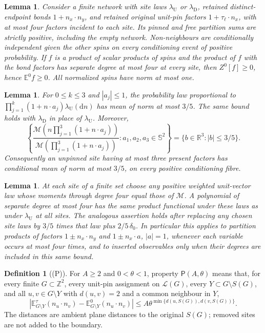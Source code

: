\documentclass[11pt,reqno]{amsart}
\newtheorem{lemma}[theorem]{Lemma}
\theoremstyle{definition}
\newtheorem{definition}[theorem]{Definition}
\theoremstyle{remark}
\begin{document}
\begin{lemma}\label{l:finitefacts}
Consider a finite network with site laws \(\lambda_{\mathrm U}\) or
\(\lambda_{\mathrm D}\), retained distinct-endpoint bonds
\(1+n_x\cdot n_y\), and retained original unit-pin factors
\(1+\tau_\ell\cdot n_x\), with at most four factors incident to each site.
Its pinned and free partition sums are strictly positive, including
the empty network. Non-neighbours are conditionally independent given
the other spins on every conditioning event of positive probability.
If \(f\) is a product of scalar products of spins and the product of
\(f\) with the bond factors has separate degree at most four at every
site, then \(Z^0[f]\ge0\), hence \(\mathbb E^0 f\ge0\).
All normalized spins have norm at most one.
\end{lemma}

\begin{lemma}\label{l:35}
For \(0\le k\le3\) and \(|a_j|\le1\), the probability law proportional to
\(\prod_{j=1}^k(1+n\cdot a_j)\lambda_{\mathrm U}(\mathrm dn)\)
has mean of norm at most \(3/5\). The same bound holds with
\(\lambda_{\mathrm D}\) in place of \(\lambda_{\mathrm U}\).
Moreover,
\[
 \left\{
 \frac{\mathcal M\!\left(n\prod_{j=1}^3(1+n\cdot a_j)\right)}
      {\mathcal M\!\left(\prod_{j=1}^3(1+n\cdot a_j)\right)}
       :a_1,a_2,a_3\in\mathbb S^2
 \right\}=\{b\in\mathbb R^3:|b|\le3/5\}.
\]
Consequently an unpinned site having at most three present factors
has conditional mean of norm at most \(3/5\), on every positive
conditioning fibre.
\end{lemma}

\begin{lemma}\label{l:exact}
At each site of a finite set choose any positive weighted unit-vector
law whose moments through degree four equal those of \(\mathcal M\).
A polynomial of separate degree at most four has the same product
functional under these laws as under \(\lambda_{\mathrm U}\) at all
sites. The analogous assertion holds after replacing any chosen site
laws by \(3/5\) times that law plus \(2/5\,\delta_0\).
In particular this applies to partition products of factors
\(1\pm n_x\cdot n_y\) and \(1\pm n_x\cdot a\), \(|a|=1\), whenever
each variable occurs at most four times, and to inserted observables
only when their degrees are included in this same bound.
\end{lemma}

\begin{definition}[(P)]\label{h:P}
For \(A\ge2\) and \(0<\theta<1\), property \(\mathsf P(A,\theta)\)
means that, for every finite \(G\subset\mathbb Z^2\), every unit-pin
assignment on \(\mathcal L(G)\), every
\(Y\subset G\setminus S(G)\), and all \(u,v\in G\setminus Y\) with
\(d(u,v)=2\) and a common neighbour in \(Y\),
\[
 \left|\mathbb E^\tau_{G\setminus Y}(n_u\cdot n_v)
             -\mathbb E^0_{G\setminus Y}(n_u\cdot n_v)\right|
 \le A\theta^{\min\{d(u,S(G)),d(v,S(G))\}} .
\]
The distances are ambient plane distances to the original \(S(G)\);
removed sites are not added to the boundary.
\end{definition}
\end{document}
